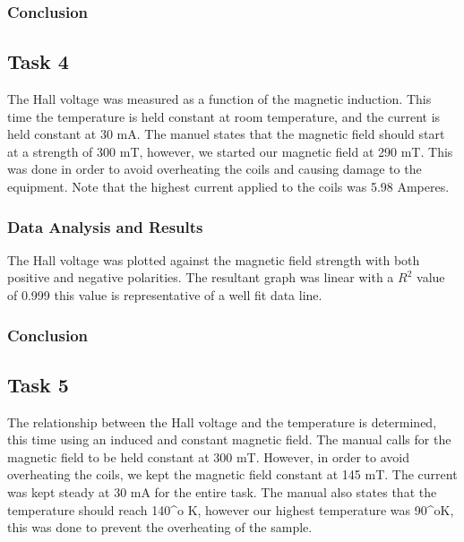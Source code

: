 \documentclass[a4paper]{article}
\begin{document}
\subsubsection{Conclusion}

\subsection{Task 4}

\qq The Hall voltage was measured as a function of the magnetic
induction. This time the temperature is held constant at room
temperature, and the current is held constant at 30 mA. The manuel
states that the magnetic field should start at a strength of 300 mT,
however, we started our magnetic field at 290 mT. This was done in
order to avoid overheating the coils and causing damage to the
equipment. Note that the highest current applied to the coils was 5.98
Amperes.

\subsubsection{Data Analysis and Results}
\qq The Hall voltage was plotted against the magnetic field strength
with both positive and negative polarities. The resultant graph was
linear with a $R^2$ value of 0.999 this value is representative of a
well fit data line.

\subsubsection{Conclusion}

\subsection{Task 5}

\qq The relationship between the Hall voltage and the temperature is
determined, this time using an induced and constant magnetic
field. The manual calls for the magnetic field to be held constant at
300 mT. However, in order to avoid overheating the coils, we kept the
magnetic field constant at 145 mT. The current was kept steady at 30
mA for the entire task. The manual also states that the temperature
should reach 140^o K, however our highest temperature was 90^oK, this
was done to prevent the overheating of the sample.
\end{document}
